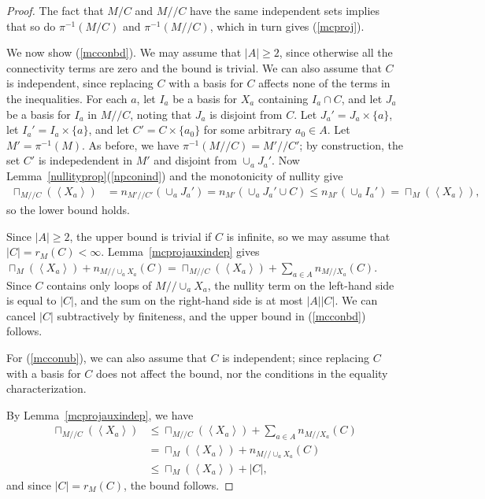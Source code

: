 \documentclass{amsart}
\theoremstyle{plain}
\theoremstyle{definition}
\newcommand{\dcon}{/ \!\! /}
\newcommand{\con}{/}
\newcommand{\ab}[1]{\left\langle#1\right\rangle}
\renewcommand{\le}{\leqslant}
\renewcommand{\ge}{\geqslant}
\begin{document}
\begin{proof}
  The fact that $M \con C$ and $M \dcon C$ have the same independent sets implies that so do 
  $\pi^{-1}(M \con C)$ and $\pi^{-1}(M \dcon C)$, which in turn gives (\ref{mcproj}).
 
  We now show (\ref{mcconbd}). 
  We may assume that $|A| \ge 2$, 
  since otherwise all the connectivity terms are zero 
  and the bound is trivial. 
  We can also assume that $C$ is independent, 
  since replacing $C$ with a basis for $C$
  affects none of the terms in the inequalities. 
  For each $a$, let $I_a$ be a basis for $X_a$ 
  containing $I_a \cap C$, and let $J_a$ be a basis for $I_a$ in $M \dcon C$, 
  noting that $J_a$ is disjoint from $C$. 
  Let $J_a' = J_a \times \{a\}$, let $I_a' = I_a \times \{a\}$, 
  and let $C' = C \times \{a_0\}$ for some arbitrary $a_0 \in A$. 
  Let $M' = \pi^{-1}(M)$. As before, we have $\pi^{-1}(M \dcon C) = M' \dcon C'$;
  by construction, the set $C'$ is indepedendent in $M'$ and disjoint from $\cup_a {J_a'}$. 
  Now Lemma~\ref{nullityprop}(\ref{npconind}) and the monotonicity
  of nullity give
  \begin{align*}
    \sqcap_{M \dcon C}(\ab{X_a}) &= n_{M' \dcon C'}(\cup_a J_a')
    = n_{M'}(\cup_a J_a' \cup C) \le n_{M'} (\cup_a I_a') = \sqcap_{M}(\ab{X_a}),
  \end{align*}
  so the lower bound holds. 

  Since $|A| \ge 2$, the upper bound is trivial if $C$ is infinite, 
  so we may assume that $|C| = r_M(C) < \infty$. 
  Lemma~\ref{mcprojauxindep} gives 
    $\sqcap_M(\ab{X_a}) + n_{M \dcon \cup_a X_a} (C) = \sqcap_{M \dcon C}(\ab{X_a}) + \sum_{a \in A}n_{M \dcon X_a}(C)$.
  Since $C$ contains only loops of $M \dcon \cup_a X_a$, the nullity term on 
  the left-hand side is equal to $|C|$, and the sum on the right-hand side is at most 
  $|A||C|$. We can cancel $|C|$ subtractively by finiteness, 
  and the upper bound in (\ref{mcconbd}) follows. 

  For (\ref{mcconub}), we can also assume that $C$ is independent; 
  since replacing $C$ with a basis for $C$ does not affect the bound, 
  nor the conditions in the equality characterization. 

  By Lemma~\ref{mcprojauxindep}, we have 
  \begin{align*}
    \sqcap_{M \dcon C}(\ab{X_a}) &\le \sqcap_{M \dcon C}(\ab{X_a}) + \sum_{a \in A}n_{M \dcon X_a}(C) \\ 
    &=  \sqcap_M(\ab{X_a}) + n_{M \dcon \cup_a X_a} (C) \\
    &\le \sqcap_M(\ab{X_a}) + |C|,
  \end{align*}  
  and since $|C| = r_M(C)$, the bound follows. 


\end{proof}
\end{document}
